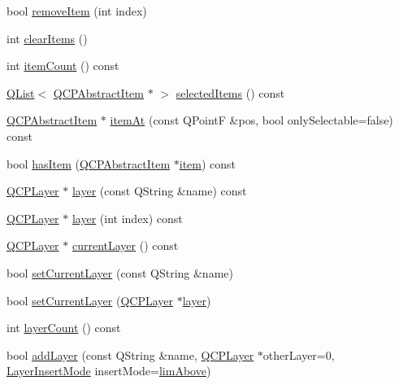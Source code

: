 \begin{DoxyCompactItemize}
\item 
bool \hyperlink{class_q_custom_plot_abcfdda3d601c0441cab136137d715dea}{remove\+Item} (int index)
\item 
int \hyperlink{class_q_custom_plot_abdfd07d4f0591d0cf967f85013fd3645}{clear\+Items} ()
\item 
int \hyperlink{class_q_custom_plot_a16025daf0341f9362be3080e404424c2}{item\+Count} () const
\item 
\hyperlink{class_q_list}{Q\+List}$<$ \hyperlink{class_q_c_p_abstract_item}{Q\+C\+P\+Abstract\+Item} $\ast$ $>$ \hyperlink{class_q_custom_plot_afda487bcf2d6cf1a57173d82495e29ba}{selected\+Items} () const
\item 
\hyperlink{class_q_c_p_abstract_item}{Q\+C\+P\+Abstract\+Item} $\ast$ \hyperlink{class_q_custom_plot_ac08578e0e6c059c83a8d340ba0038e8e}{item\+At} (const Q\+PointF \&pos, bool only\+Selectable=false) const
\item 
bool \hyperlink{class_q_custom_plot_af0b57f35646079f93fa6161a65b36109}{has\+Item} (\hyperlink{class_q_c_p_abstract_item}{Q\+C\+P\+Abstract\+Item} $\ast$\hyperlink{class_q_custom_plot_ac042f2e78edd228ccf2f26b7fe215239}{item}) const
\item 
\hyperlink{class_q_c_p_layer}{Q\+C\+P\+Layer} $\ast$ \hyperlink{class_q_custom_plot_a0a96244e7773b242ef23c32b7bdfb159}{layer} (const Q\+String \&name) const
\item 
\hyperlink{class_q_c_p_layer}{Q\+C\+P\+Layer} $\ast$ \hyperlink{class_q_custom_plot_acbb570f4c24306e7c2324d40bfe157c2}{layer} (int index) const
\item 
\hyperlink{class_q_c_p_layer}{Q\+C\+P\+Layer} $\ast$ \hyperlink{class_q_custom_plot_a0421d647f420b0b4c57aec1708857af5}{current\+Layer} () const
\item 
bool \hyperlink{class_q_custom_plot_a73a6dc47c653bb6f8f030abca5a11852}{set\+Current\+Layer} (const Q\+String \&name)
\item 
bool \hyperlink{class_q_custom_plot_a23a4d3cadad1a0063c5fe19aac5659e6}{set\+Current\+Layer} (\hyperlink{class_q_c_p_layer}{Q\+C\+P\+Layer} $\ast$\hyperlink{class_q_custom_plot_a0a96244e7773b242ef23c32b7bdfb159}{layer})
\item 
int \hyperlink{class_q_custom_plot_afa45d61e65292026f4c58c9c88c2cef0}{layer\+Count} () const
\item 
bool \hyperlink{class_q_custom_plot_ad5255393df078448bb6ac83fa5db5f52}{add\+Layer} (const Q\+String \&name, \hyperlink{class_q_c_p_layer}{Q\+C\+P\+Layer} $\ast$other\+Layer=0, \hyperlink{class_q_custom_plot_a75a8afbe6ef333b1f3d47abb25b9add7}{Layer\+Insert\+Mode} insert\+Mode=\hyperlink{class_q_custom_plot_a75a8afbe6ef333b1f3d47abb25b9add7a56ffb40bbf81e9b5d869cffc88999a36}{lim\+Above})

\end{DoxyCompactItemize}
